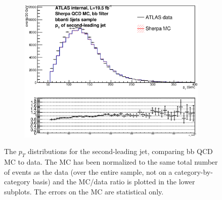 \begin{figure}[phtb!]
\begin{center}
  \begin{subfigure}[$bbanti$ 5+ jet category]{0.3\textwidth}\includegraphics[width=\textwidth]{MonteCarlo/figures/pt1_bbanti_5jets.eps}\end{subfigure}
  \caption{The $p_T$ distributions for the second-leading jet, comparing bb QCD MC to data.  The MC has been normalized
  to the same total number of events as the data (over the entire sample, not on a category-by-category basis)
  and the MC/data ratio is plotted in the lower subplots.  The errors on the MC are statistical only.
  \label{fig:bb_qcd_mc_pt1}}
    \end{center}
\end{figure}

